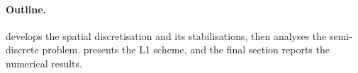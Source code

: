 \paragraph{Outline.}
 develops the spatial discretisation and its stabilisations, then analyses the semi-discrete problem.  presents the L1 scheme, and the final section reports the numerical results.
